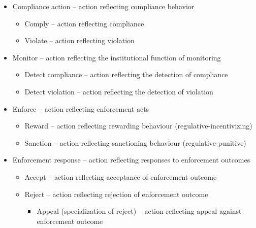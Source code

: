\begin{itemize}
\item Compliance action -- action reflecting compliance behavior
	\begin{itemize}
	\item Comply -- action reflecting compliance
	\item Violate -- action reflecting violation
	\end{itemize}

\item Monitor -- action reflecting the institutional function of monitoring
	\begin{itemize}
	\item Detect compliance -- action reflecting the detection of compliance
	\item Detect violation -- action reflecting the detection of violation
	\end{itemize}

\item Enforce -- action reflecting enforcement acts
	\begin{itemize}
	\item Reward -- action reflecting rewarding behaviour (regulative-incentivizing)
	\item Sanction -- action reflecting sanctioning behaviour (regulative-punitive)
	\end{itemize}

\item Enforcement response -- action reflecting responses to enforcement outcomes
	\begin{itemize}
	\item Accept -- action reflecting acceptance of enforcement outcome
	\item Reject -- action reflecting rejection of enforcement outcome
		\begin{itemize}
		\item Appeal (specialization of reject) -- action reflecting appeal against enforcement outcome
		\end{itemize}
	\end{itemize}


\end{itemize}
